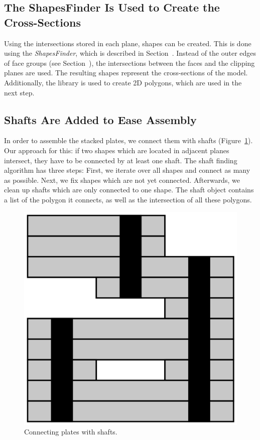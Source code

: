 \documentclass[../ClassicThesis.tex]{subfiles}
\begin{document}
\subsection{The ShapesFinder Is Used to Create the Cross-Sections}

Using the intersections stored in each plane, shapes can be created. This is done using the \emph{ShapesFinder}, which is described in Section~. Instead of the outer edges of face groups (see Section~), the intersections between the faces and the clipping planes are used. The resulting shapes represent the cross-sections of the model. Additionally, the \jsclipper{} library is used to create 2D polygons, which are used in the next step.

\subsection{Shafts Are Added to Ease Assembly}

In order to assemble the stacked plates, we connect them with shafts (Figure~\ref{fig:shafts}). Our approach for this: if two shapes which are located in adjacent planes intersect, they have to be connected by at least one shaft. The shaft finding algorithm has three steps: First, we iterate over all shapes and connect as many as possible. Next, we fix shapes which are not yet connected. Afterwards, we clean up shafts which are only connected to one shape. The shaft object contains a list of the polygon it connects, as well as the intersection of all these polygons.

\begin{figure}
    \centering
    \includegraphics[width=1.0\columnwidth]{Images/plates_shafts.png}
    \caption{Connecting plates with shafts.}
    \label{fig:shafts}
\end{figure}
\end{document}
